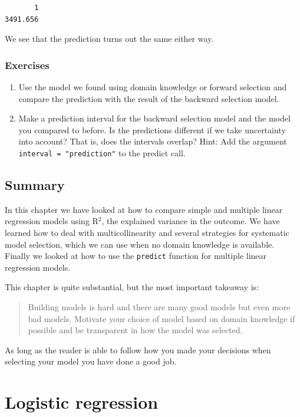 \documentclass[
  letterpaper,
  DIV=11,
  numbers=noendperiod]{scrreprt}
\providecommand{\tightlist}{%
  \setlength{\itemsep}{0pt}\setlength{\parskip}{0pt}}\usepackage{longtable,booktabs,array}
\begin{document}
\begin{verbatim}
       1 
3491.656 
\end{verbatim}

We see that the prediction turns out the same either way.

\subsection{Exercises}\label{exercises-21}

\begin{enumerate}
\def\labelenumi{\arabic{enumi}.}
\tightlist
\item
  Use the model we found using domain knowledge or forward selection and
  compare the prediction with the result of the backward selection
  model.
\item
  Make a prediction interval for the backward selection model and the
  model you compared to before. Is the predictions different if we take
  uncertainty into account? That is, does the intervals overlap? Hint:
  Add the argument \texttt{interval\ =\ "prediction"} to the predict
  call.
\end{enumerate}

\section{Summary}\label{summary-1}

In this chapter we have looked at how to compare simple and multiple
linear regression models using R\(^2\), the explained variance in the
outcome. We have learned how to deal with multicollinearity and several
strategies for systematic model selection, which we can use when no
domain knowledge is available. Finally we looked at how to use the
\texttt{predict} function for multiple linear regression models.

This chapter is quite substantial, but the most important takeaway is:

\begin{quote}
Building models is hard and there are many good models but even more bad
models. Motivate your choice of model based on domain knowledge if
possible and be transparent in how the model was selected.
\end{quote}

As long as the reader is able to follow how you made your decisions when
selecting your model you have done a good job.

\chapter{Logistic regression}\label{logistic-regression}
\end{document}

